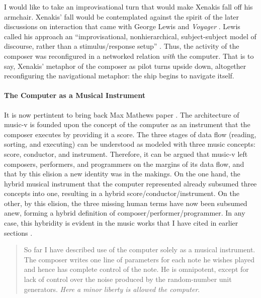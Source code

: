 I would like to take an improvisational turn that would make Xenakis fall off his armchair. Xenakis' fall would be contemplated against the spirit of the later discussions on interaction that came with George Lewis and \textit{Voyager} \parencite{Lew93:Put, Lew99:Int, Lew00:Too}. Lewis called his approach an ``improvisational, nonhierarchical, subject-subject model of discourse, rather than a stimulus/response setup'' \parencite[104]{Lew99:Int}. Thus, the activity of the composer was reconfigured in a networked relation \textit{with} the computer. That is to say, Xenakis' metaphor of the composer as pilot turns upside down, altogether reconfiguring the navigational metaphor: the ship begins to navigate itself.

\paragraph{The Computer as a Musical Instrument}


It is now pertintent to bring back Max Mathews paper  \parencite{Mat63:The}. The architecture of \gls{music-v} is founded upon the concept of the computer as an instrument that the composer executes by providing it a score. The three stages of data flow (reading, sorting, and executing) can be understood as modeled with three music concepts: score, conductor, and instrument. Therefore, it can be argued that \gls{music-v} left composers, performers, and programmers on the margins of its data flow, and that by this elision a new identity was in the makings. On the one hand, the hybrid musical instrument that the computer represented already subsumed three concepts into one, resulting in a hybrid score/conductor/instrument. On the other, by this elision, the three missing human terms have now been subsumed anew, forming a hybrid definition of composer/performer/programmer. In any case, this hybridity is evident in the music works that I have cited in earlier sections .

\begin{quote}
	So far I have described use of the computer solely as a musical instrument. The composer writes one line of parameters for each note he wishes played and hence has complete control of the note. He is omnipotent, except for lack of control over the noise produced by the random-number unit generators. \textit{Here a minor liberty is allowed the computer}. \im \parencite[557]{Mat63:The}
\end{quote}

